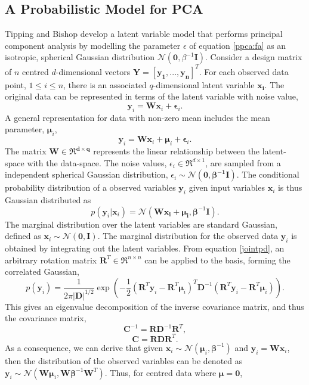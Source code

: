 \documentclass[ %
author={Dillon Keith Diep},
supervisor={Dr. Carl Henrik Ek},
degree={MEng},
title={ART-CG:},
subtitle={Assisted Real-time Content Generation of 3D Hair by Learning Manifolds},
type={Research},
year={2017} ]{dissertation}
\begin{document}
\subsection{A Probabilistic Model for PCA}
Tipping and Bishop develop a latent variable model that performs principal component analysis by modelling the parameter $\epsilon$ of equation \ref{ppca:fa} as an isotropic, spherical Gaussian distribution $\mathcal{N}(\bm{0},\beta^{-1}\bm{I})$. Consider a design matrix of $n$ centred $d$-dimensional vectors $\bm{Y=[y_1,...,y_n]}^T$.
For each observed data point, $1 \leq i \leq n $, there is an associated $q$-dimensional latent variable $\bm{x_i}$.
The original data can be represented in terms of the latent variable with noise value,
$$\bm{y}_i=\bm{Wx}_i+\bm{\epsilon}_i.$$
A general representation for data with non-zero mean includes the mean parameter, $\bm{\mu}_i$,
$$\bm{y}_i=\bm{Wx}_i+\bm{\mu}_i+\bm{\epsilon}_i.$$
The matrix $\bm{W \in \Re^{d \times q}}$ represents the linear relationship between the latent-space with the  data-space. The noise values, $\epsilon_i \in \Re^{d \times 1}$, are sampled from a independent spherical Gaussian distribution, $\epsilon_i\sim\mathcal{N}(\bm{0, \beta^{-1}I})$.
The conditional probability distribution of a observed variables $\bm{y}_i$ given input variables $\bm{x}_i$ is thus Gaussian distributed as
\begin{equation} \label{ppca:conditional}
p(\bm{y}_i|\bm{x}_i)=\mathcal{N}(\bm{W\bm{x}_i+\bm{\mu}_i},\bm{\beta}^{-1}\bm{I}). 
\end{equation}
The marginal distribution over the latent variables are standard Gaussian, defined as $\bm{x}_i\sim\mathcal{N}(\bm{0},\bm{I})$. The marginal distribution for the observed data $\bm{y}_i$ is obtained by integrating out the latent variables.
From equation \ref{jointpd}, an arbitrary rotation matrix $\bm{R}^T\in\Re^{n \times n}$ can be applied to the basis, forming the correlated Gaussian,
$$p(\bm{y}_i)=\frac{1}{2\pi|\bm{D}|^{1/2}}\exp\left(-\frac{1}{2}(\bm{R}^T\bm{y}_i-\bm{R}^T\bm{\mu}_i)^T\bm{D}^{-1}(\bm{R}^T\bm{y}_i-\bm{R}^T\bm{\mu}_i)\right).$$
This gives an eigenvalue decomposition of the inverse covariance matrix, and thus the covariance matrix,
$$\bm{C}^{-1}=\bm{RD}^{-1}\bm{R}^T,$$
$$\bm{C}=\bm{RDR}^T.$$
As a consequence, we can derive that given $\bm{x}_i\sim\mathcal{N}(\bm{\mu}_i,\bm{\beta}^{-1})$ and $\bm{y}_i=\bm{Wx}_i$, then the distribution of the observed variables can be denoted as $\bm{y}_i\sim\mathcal{N}(\bm{W\mu}_i,\bm{W\beta}^{-1}\bm{W}^T)$.
Thus, for centred data where $\bm{\mu}=\bm{0}$, 
\end{document}
